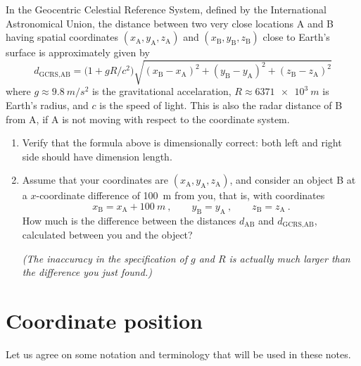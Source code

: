 \documentclass[a4paper,12pt,%
onecolumn,oneside,%
british%
]{memoir}
\renewcommand*{\|}[1][]{\nonscript\:#1\vert\nonscript\:\mathopen{}}
\newcommand*{\yc}{c} %
\begin{document}
\begin{exercise}
  In the Geocentric Celestial Reference System, defined by the International Astronomical Union, the distance between two very close locations A and B having spatial coordinates $(x_{\textrm{A}}, y_{\textrm{A}}, z_{\textrm{A}})$ and $(x_{\textrm{B}}, y_{\textrm{B}}, z_{\textrm{B}})$ close to Earth's surface is approximately given by
\begin{equation}
  \label{eq:distance_GCRS}
  d_{\textrm{GCRS},\textrm{A}\textrm{B}} = \bigl(1 + g R/\yc^{2}\bigr)
  \sqrt{
    (x_{\textrm{B}} - x_{\textrm{A}})^{2} +
    (y_{\textrm{B}} - y_{\textrm{A}})^{2} +
    (z_{\textrm{B}} - z_{\textrm{A}})^{2}
  }
\end{equation}
where $g \approx \qty{9.8}{m/s^{2}}$ is the gravitational accelaration, $R \approx \qty{6371e3}{m}$ is Earth's radius, and $\yc$ is the speed of light. This is also the radar distance of B from A, if A is not moving with respect to the coordinate system.
\begin{enumerate}[exerc]
\item Verify that the formula above is dimensionally correct: both left and right side should have dimension \textsf{length}.
\item Assume that your coordinates are $(x_{\textrm{A}}, y_{\textrm{A}}, z_{\textrm{A}})$, and consider an object B at a $x$-coordinate difference of \qty{100}{m} from you, that is, with coordinates
  \begin{equation*}
    x_{\textrm{B}} = x_{\textrm{A}} + \qty{100}{m}
    \ ,\qquad
    y_{\textrm{B}} = y_{\textrm{A}}
    \ ,\qquad
    z_{\textrm{B}} = z_{\textrm{A}} \ .
  \end{equation*}
  How much is the difference between the distances $d_{\textrm{A}\textrm{B}}$ and $d_{\textrm{GCRS},\textrm{A}\textrm{B}}$, calculated between you and the object?

  \emph{(The inaccuracy in the specification of $g$ and $R$ is actually much larger than the difference you just found.)}
\end{enumerate}
\end{exercise}

\section{Coordinate position}
\label{sec:position_vector}

Let us agree on some notation and terminology that will be used in these notes.
\end{document}
